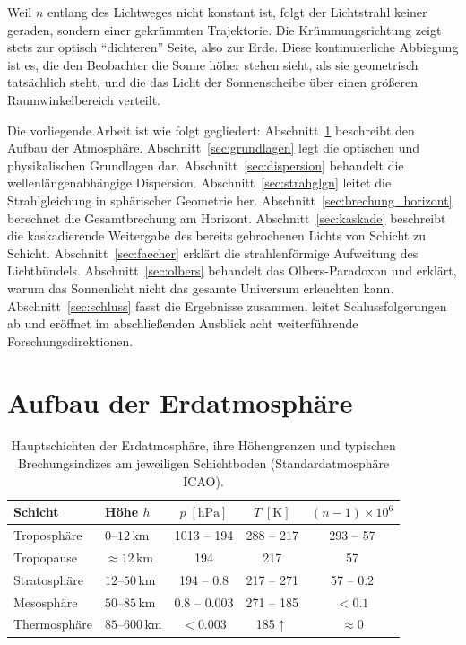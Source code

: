 \documentclass[12pt,a4paper]{article}
\providecommand{\SI}[2]{\ensuremath{#1\,#2}}
\providecommand{\si}[1]{\ensuremath{#1}}
\providecommand{\kilo}{\mathrm{k}}
\providecommand{\hecto}{\mathrm{h}}
\providecommand{\metre}{\mathrm{m}}
\providecommand{\pascal}{\mathrm{Pa}}
\providecommand{\kelvin}{\mathrm{K}}
\begin{document}
Weil $n$ entlang des Lichtweges nicht konstant ist,
folgt der Lichtstrahl keiner geraden, sondern einer gekrümmten
Trajektorie.
Die Krümmungsrichtung zeigt stets zur optisch ``dichteren'' Seite,
also zur Erde.
Diese kontinuierliche Abbiegung ist es, die den Beobachter
die Sonne höher stehen sieht, als sie geometrisch tatsächlich steht,
und die das Licht der Sonnenscheibe über einen größeren
Raumwinkelbereich verteilt.

Die vorliegende Arbeit ist wie folgt gegliedert:
Abschnitt~\ref{sec:schichten} beschreibt den Aufbau der Atmosphäre.
Abschnitt~\ref{sec:grundlagen} legt die optischen und physikalischen
Grundlagen dar.
Abschnitt~\ref{sec:dispersion} behandelt die wellenlängenabhängige Dispersion.
Abschnitt~\ref{sec:strahglgn} leitet die Strahlgleichung in
sphärischer Geometrie her.
Abschnitt~\ref{sec:brechung_horizont} berechnet die
Gesamtbrechung am Horizont.
Abschnitt~\ref{sec:kaskade} beschreibt die kaskadierende Weitergabe
des bereits gebrochenen Lichts von Schicht zu Schicht.
Abschnitt~\ref{sec:faecher} erklärt die strahlenförmige Aufweitung
des Lichtbündels.
Abschnitt~\ref{sec:olbers} behandelt das Olbers-Paradoxon
und erklärt, warum das Sonnenlicht nicht das gesamte Universum
erleuchten kann.
Abschnitt~\ref{sec:schluss} fasst die Ergebnisse zusammen,
leitet Schlussfolgerungen ab und eröffnet im abschließenden
Ausblick acht weiterführende Forschungsdirektionen.

\section{Aufbau der Erdatmosphäre}
\label{sec:schichten}

\begin{table}[htbp]
\centering
\caption{Hauptschichten der Erdatmosphäre, ihre
         Höhengrenzen und typischen Brechungsindizes
         am jeweiligen Schichtboden (Standardatmosphäre ICAO).}
\label{tab:schichten}
\begin{tabular}{llccc}
\toprule
Schicht & Höhe $h$ & $p\;[\si{\hecto\pascal}]$ & $T\;[\si{\kelvin}]$ & $(n-1)\times 10^{6}$ \\
\midrule
Troposphäre       & $0$--$\SI{12}{\kilo\metre}$   & 1013 -- 194  & 288 -- 217 & 293 -- 57  \\
Tropopause        & $\approx\SI{12}{\kilo\metre}$ & 194         & 217       & 57        \\
Stratosphäre      & $12$--$\SI{50}{\kilo\metre}$  & 194 -- 0.8   & 217 -- 271 & 57 -- 0.2  \\
Mesosphäre        & $50$--$\SI{85}{\kilo\metre}$  & 0.8 -- 0.003 & 271 -- 185 & $<0.1$    \\
Thermosphäre      & $85$--$\SI{600}{\kilo\metre}$ & $<$0.003    & 185$\uparrow$      & $\approx 0$\\
\bottomrule
\end{tabular}
\end{table}
\end{document}
